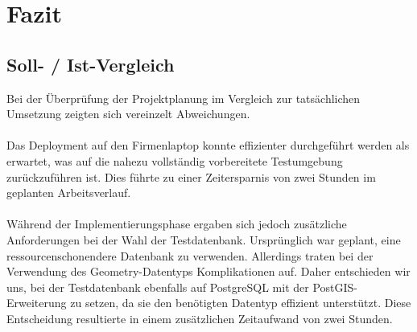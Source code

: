 \documentclass[a4paper,12pt]{article}
\begin{document}
\section{Fazit}
\subsection{Soll- / Ist-Vergleich}
Bei der Überprüfung der Projektplanung im Vergleich zur tatsächlichen Umsetzung zeigten sich vereinzelt Abweichungen.\\
\\
Das Deployment auf den Firmenlaptop konnte effizienter durchgeführt werden als erwartet, was auf die nahezu vollständig vorbereitete Testumgebung zurückzuführen ist. Dies führte zu einer Zeitersparnis von zwei Stunden im geplanten Arbeitsverlauf.\\
\\
Während der Implementierungsphase ergaben sich jedoch zusätzliche Anforderungen bei der Wahl der Testdatenbank. Ursprünglich war geplant, eine ressourcenschonendere Datenbank zu verwenden. Allerdings traten bei der Verwendung des Geometry-Datentyps Komplikationen auf. Daher entschieden wir uns, bei der Testdatenbank ebenfalls auf PostgreSQL mit der PostGIS-Erweiterung zu setzen, da sie den benötigten Datentyp effizient unterstützt. Diese Entscheidung resultierte in einem zusätzlichen Zeitaufwand von zwei Stunden.
\end{document}
